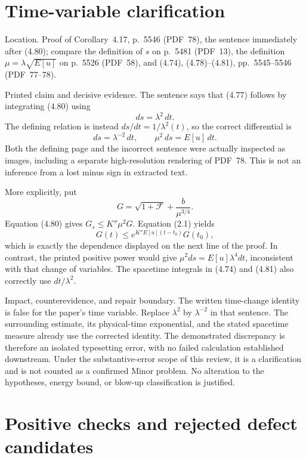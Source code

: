 \documentclass[10pt]{article}
\begin{document}
\section*{Time-variable clarification}
Location. Proof of Corollary 4.17, p. 5546 (PDF 78), the sentence immediately after (4.80); compare the definition of \(s\) on p. 5481 (PDF 13), the definition \(\mu=\lambda\sqrt{E[u]}\) on p. 5526 (PDF 58), and (4.74), (4.78)–(4.81), pp. 5545–5546 (PDF 77–78).\par
Printed claim and decisive evidence. The sentence says that (4.77) follows by integrating (4.80) using \[ds=\lambda^2\,dt.\] The defining relation is instead \(ds/dt=1/\lambda^2(t)\), so the correct differential is \[ds=\lambda^{-2}\,dt,\qquad
\mu^2\,ds=E[u]\,dt.                                      \tag{2.1}\] Both the defining page and the incorrect sentence were actually inspected as images, including a separate high-resolution rendering of PDF 78. This is not an inference from a lost minus sign in extracted text.\par
More explicitly, put \[G=\sqrt{1+\mathcal F}+\frac{b}{\mu^{3/4}}.\] Equation (4.80) gives \(G_s\le K''\mu^2G\). Equation (2.1) yields \[G(t)\le e^{K''E[u](t-t_0)}G(t_0),\] which is exactly the dependence displayed on the next line of the proof. In contrast, the printed positive power would give \(\mu^2ds=E[u]\lambda^4dt\), inconsistent with that change of variables. The spacetime integrals in (4.74) and (4.81) also correctly use \(dt/\lambda^2\).\par
Impact, counterevidence, and repair boundary. The written time-change identity is false for the paper’s time variable. Replace \(\lambda^2\) by \(\lambda^{-2}\) in that sentence. The surrounding estimate, its physical-time exponential, and the stated spacetime measure already use the corrected identity. The demonstrated discrepancy is therefore an isolated typesetting error, with no failed calculation established downstream. Under the substantive-error scope of this review, it is a clarification and is not counted as a confirmed Minor problem. No alteration to the hypotheses, energy bound, or blow-up classification is justified.\par
\section*{Positive checks and rejected defect candidates}
\end{document}
